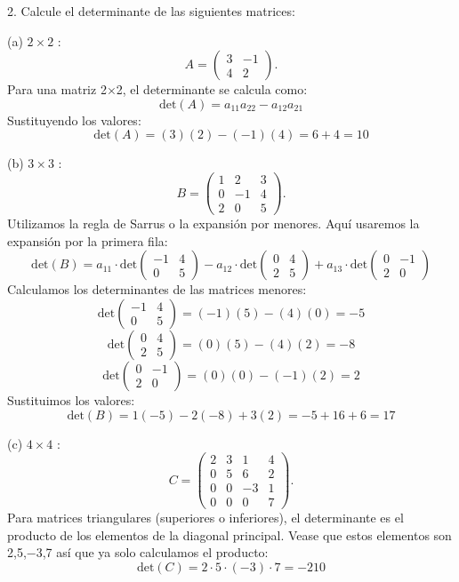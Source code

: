 2. Calcule el determinante de las siguientes matrices: \\
\begin{solution}
(a)  \( 2 \times 2 \) :
\[
A=\left(\begin{array}{cc}
3 & -1 \\
4 & 2
\end{array}\right) .
\]
Para una matriz 2×2, el determinante se calcula como:
\[
\text{det}(A) = a_{11}a_{22} - a_{12}a_{21}
\]
Sustituyendo los valores:
\[
\text{det}(A) = (3)(2) - (-1)(4) = 6 + 4 = 10
\]

(b)  \( 3 \times 3 \) :
\[
B=\left(\begin{array}{ccc}
1 & 2 & 3 \\
0 & -1 & 4 \\
2 & 0 & 5
\end{array}\right) .
\]
Utilizamos la regla de Sarrus o la expansión por menores. Aquí usaremos la expansión por la primera fila:
\[
\text{det}(B) = a_{11} \cdot \text{det}\begin{pmatrix} -1 & 4 \\ 0 & 5 \end{pmatrix} - a_{12} \cdot \text{det}\begin{pmatrix} 0 & 4 \\ 2 & 5 \end{pmatrix} + a_{13} \cdot \text{det}\begin{pmatrix} 0 & -1 \\ 2 & 0 \end{pmatrix}
\]
Calculamos los determinantes de las matrices menores:
\[
\text{det}\begin{pmatrix} -1 & 4 \\ 0 & 5 \end{pmatrix} = (-1)(5) - (4)(0) = -5
\]
\[
\text{det}\begin{pmatrix} 0 & 4 \\ 2 & 5 \end{pmatrix} = (0)(5) - (4)(2) = -8
\]
\[
\text{det}\begin{pmatrix} 0 & -1 \\ 2 & 0 \end{pmatrix} = (0)(0) - (-1)(2) = 2
\]
Sustituimos los valores:
\[
\text{det}(B) = 1(-5) - 2(-8) + 3(2) = -5 + 16 + 6 = 17
\]



(c)  \( 4 \times 4 \) :
\[
C=\left(\begin{array}{cccc}
2 & 3 & 1 & 4 \\
0 & 5 & 6 & 2 \\
0 & 0 & -3 & 1 \\
0 & 0 & 0 & 7
\end{array}\right) .
\]
Para matrices triangulares (superiores o inferiores), el determinante es el producto de los elementos de la diagonal principal. Vease que estos elementos son 2,5,−3,7 así que ya solo calculamos el producto:
\[
\text{det}(C) = 2 \cdot 5 \cdot (-3) \cdot 7 = -210



\]
\end{solution}
